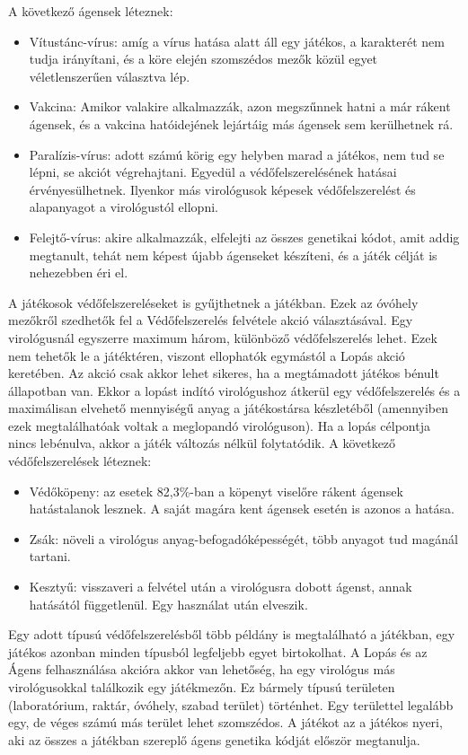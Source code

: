 A következő ágensek léteznek:
\begin{itemize}
	\item Vítustánc-vírus: amíg a vírus hatása alatt áll egy játékos, a karakterét nem tudja irányítani, és a köre elején szomszédos mezők közül egyet véletlenszerűen választva lép.
	\item Vakcina: Amikor valakire alkalmazzák, azon megszűnnek hatni a már rákent ágensek, és a vakcina hatóidejének lejártáig más ágensek sem kerülhetnek rá.
	\item Paralízis-vírus: adott számú körig egy helyben marad a játékos, nem tud se lépni, se akciót végrehajtani. Egyedül a védőfelszerelésének hatásai érvényesülhetnek. Ilyenkor más virológusok képesek védőfelszerelést és alapanyagot a virológustól ellopni.
	\item Felejtő-vírus: akire alkalmazzák, elfelejti az összes genetikai kódot, amit addig megtanult, tehát nem képest újabb ágenseket készíteni, és a játék célját is nehezebben éri el.
\end{itemize}
A játékosok védőfelszereléseket is gyűjthetnek a játékban. Ezek az óvóhely mezőkről szedhetők fel a Védőfelszerelés felvétele akció választásával. Egy virológusnál egyszerre maximum három, különböző védőfelszerelés lehet. Ezek nem tehetők le a játéktéren, viszont ellophatók egymástól a Lopás akció keretében. Az akció csak akkor lehet sikeres, ha a megtámadott játékos bénult állapotban van. Ekkor a lopást indító virológushoz átkerül egy védőfelszerelés és a maximálisan elvehető mennyiségű anyag a játékostársa készletéből (amennyiben ezek megtalálhatóak voltak a meglopandó virológuson). Ha a lopás célpontja nincs lebénulva, akkor  a játék változás nélkül folytatódik.
A következő védőfelszerelések léteznek:
\begin{itemize}
	\item Védőköpeny: az esetek 82,3\%-ban a köpenyt viselőre rákent ágensek hatástalanok lesznek. A saját magára kent ágensek esetén is azonos a hatása.
	\item Zsák: növeli a virológus anyag-befogadóképességét, több anyagot tud magánál tartani.
	\item Kesztyű: visszaveri a felvétel után a virológusra dobott ágenst, annak hatásától függetlenül. Egy használat után elveszik.
\end{itemize}
Egy adott típusú védőfelszerelésből több példány is megtalálható a játékban, egy játékos azonban minden típusból legfeljebb egyet birtokolhat.
A Lopás és az Ágens felhasználása akcióra akkor van lehetőség, ha egy virológus más virológusokkal találkozik egy játékmezőn. Ez bármely típusú területen (laboratórium, raktár, óvóhely, szabad terület) történhet. Egy területtel legalább egy, de véges számú más terület lehet szomszédos.
A játékot az a játékos nyeri, aki az összes a játékban szereplő ágens genetika kódját először megtanulja.

